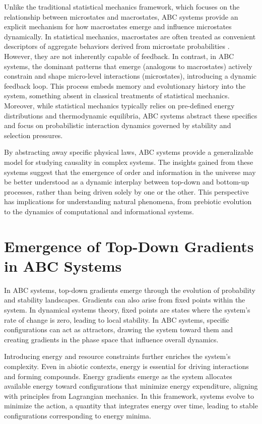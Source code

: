 \documentclass[entropy,article,submit,pdftex,moreauthors]{Definitions/mdpi}
\begin{document}
Unlike the traditional statistical mechanics framework, which focuses on the relationship between microstates and macrostates, ABC systems provide an explicit mechanism for how macrostates emerge and influence microstates dynamically. In statistical mechanics, macrostates are often treated as convenient descriptors of aggregate behaviors derived from microstate probabilities \cite{landau1980statistical}. However, they are not inherently capable of feedback. In contrast, in ABC systems, the dominant patterns that emerge (analogous to macrostates) actively constrain and shape micro-level interactions (microstates), introducing a dynamic feedback loop. This process embeds memory and evolutionary history into the system, something absent in classical treatments of statistical mechanics. Moreover, while statistical mechanics typically relies on pre-defined energy distributions and thermodynamic equilibria, ABC systems abstract these specifics and focus on probabilistic interaction dynamics governed by stability and selection pressures.

By abstracting away specific physical laws, ABC systems provide a generalizable model for studying causality in complex systems. The insights gained from these systems suggest that the emergence of order and information in the universe may be better understood as a dynamic interplay between top-down and bottom-up processes, rather than being driven solely by one or the other. This perspective has implications for understanding natural phenomena, from prebiotic evolution to the dynamics of computational and informational systems.

\section{Emergence of Top-Down Gradients in ABC Systems}

In ABC systems, top-down gradients emerge through the evolution of probability and stability landscapes. Gradients can also arise from fixed points within the system. In dynamical systems theory, fixed points are states where the system's rate of change is zero, leading to local stability. In ABC systems, specific configurations can act as attractors, drawing the system toward them and creating gradients in the phase space that influence overall dynamics.

Introducing energy and resource constraints further enriches the system's complexity. Even in abiotic contexts, energy is essential for driving interactions and forming compounds. Energy gradients emerge as the system allocates available energy toward configurations that minimize energy expenditure, aligning with principles from Lagrangian mechanics. In this framework, systems evolve to minimize the action, a quantity that integrates energy over time, leading to stable configurations corresponding to energy minima. 
\end{document}
